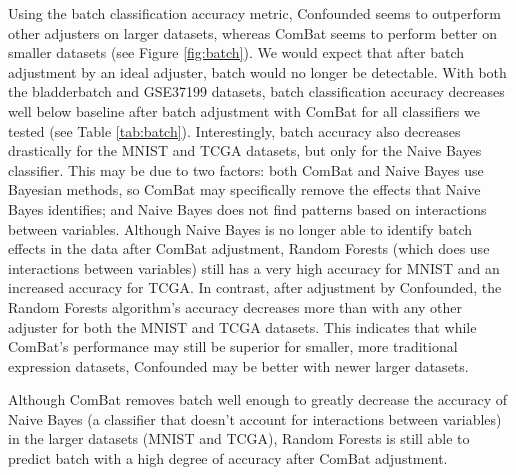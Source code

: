 \documentclass[notitlepage]{article}
\begin{document}
Using the batch classification accuracy metric, Confounded seems to outperform other adjusters on larger datasets, whereas ComBat seems to perform better on smaller datasets (see Figure \ref{fig:batch}).
We would expect that after batch adjustment by an ideal adjuster, batch would no longer be detectable.
With both the bladderbatch and GSE37199 datasets, batch classification accuracy decreases well below baseline after batch adjustment with ComBat for all classifiers we tested (see Table \ref{tab:batch}).
Interestingly, batch accuracy also decreases drastically for the MNIST and TCGA datasets, but only for the Naive Bayes classifier.
This may be due to two factors: both ComBat and Naive Bayes use Bayesian methods, so ComBat may specifically remove the effects that Naive Bayes identifies; and Naive Bayes does not find patterns based on interactions between variables.
Although Naive Bayes is no longer able to identify batch effects in the data after ComBat adjustment, Random Forests (which does use interactions between variables) still has a very high accuracy for MNIST and an increased accuracy for TCGA.
In contrast, after adjustment by Confounded, the Random Forests algorithm's accuracy decreases more than with any other adjuster for both the MNIST and TCGA datasets.
This indicates that while ComBat's performance may still be superior for smaller, more traditional expression datasets, Confounded may be better with newer larger datasets.

Although ComBat removes batch well enough to greatly decrease the accuracy of Naive Bayes (a classifier that doesn't account for interactions between variables) in the larger datasets (MNIST and TCGA), Random Forests is still able to predict batch with a high degree of accuracy after ComBat adjustment.
\end{document}
